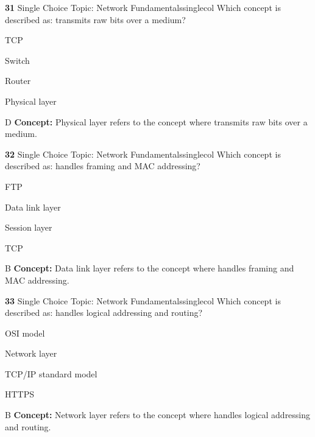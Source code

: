 \documentclass[10pt,a4paper]{article}
\begin{document}
\begin{qcard}{\color{white}\textbf{31} \hfill \small Single Choice \textbar{} Topic: Network Fundamentals}{singlecol}
Which concept is described as: transmits raw bits over a medium?

\begin{qoptions}
\item TCP
\item Switch
\item Router
\item Physical layer
\end{qoptions}
\begin{explainbox}{D}
\textbf{Concept:} Physical layer refers to the concept where transmits raw bits over a medium.
\end{explainbox}
\end{qcard}

\begin{qcard}{\color{white}\textbf{32} \hfill \small Single Choice \textbar{} Topic: Network Fundamentals}{singlecol}
Which concept is described as: handles framing and MAC addressing?

\begin{qoptions}
\item FTP
\item Data link layer
\item Session layer
\item TCP
\end{qoptions}
\begin{explainbox}{B}
\textbf{Concept:} Data link layer refers to the concept where handles framing and MAC addressing.
\end{explainbox}
\end{qcard}

\begin{qcard}{\color{white}\textbf{33} \hfill \small Single Choice \textbar{} Topic: Network Fundamentals}{singlecol}
Which concept is described as: handles logical addressing and routing?

\begin{qoptions}
\item OSI model
\item Network layer
\item TCP/IP standard model
\item HTTPS
\end{qoptions}
\begin{explainbox}{B}
\textbf{Concept:} Network layer refers to the concept where handles logical addressing and routing.
\end{explainbox}
\end{qcard}
\end{document}

